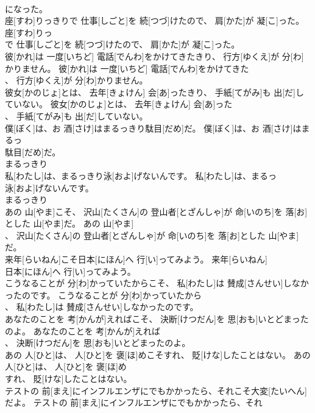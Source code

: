 \documentclass[8pt]{extreport}
\begin{document}
\begin{CJK}{UTF8}{min}
\\	になった。	
\\	座[すわ]りっきりで 仕事[しごと]を 続[つづ]けたので、 肩[かた]が 凝[こ]った。	座[すわ]りっ
\\	で 仕事[しごと]を 続[つづ]けたので、 肩[かた]が 凝[こ]った。	
\\	彼[かれ]は 一度[いちど] 電話[でんわ]をかけてきたきり、 行方[ゆくえ]が 分[わ]かりません。	彼[かれ]は 一度[いちど] 電話[でんわ]をかけてきた
\\	、 行方[ゆくえ]が 分[わ]かりません。	
\\	彼女[かのじょ]とは、 去年[きょけん] 会[あ]ったきり、 手紙[てがみ]も 出[だ]していない。	彼女[かのじょ]とは、 去年[きょけん] 会[あ]った
\\	、 手紙[てがみ]も 出[だ]していない。	
\\	僕[ぼく]は、お 酒[さけ]はまるっきり駄目[だめ]だ。	僕[ぼく]は、お 酒[さけ]はまるっ
\\	駄目[だめ]だ。	
\\	まるっきり
\\	私[わたし]は、まるっきり泳[およ]げないんです。	私[わたし]は、まるっ
\\	泳[およ]げないんです。	
\\	まるっきり
\\	あの 山[やま]こそ、 沢山[たくさん]の 登山者[とざんしゃ]が 命[いのち]を 落[お]とした 山[やま]だ。	あの 山[やま]
\\	、 沢山[たくさん]の 登山者[とざんしゃ]が 命[いのち]を 落[お]とした 山[やま]だ。	
\\	来年[らいねん]こそ日本[にほん]へ 行[い]ってみよう。	来年[らいねん]
\\	日本[にほん]へ 行[い]ってみよう。	
\\	こうなることが 分[わ]かっていたからこそ、 私[わたし]は 賛成[さんせい]しなかったのです。	こうなることが 分[わ]かっていたから
\\	、 私[わたし]は 賛成[さんせい]しなかったのです。	
\\	あなたのことを 考[かんが]えればこそ、 決断[けつだん]を 思[おも]いとどまったのよ。	あなたのことを 考[かんが]えれば
\\	、 決断[けつだん]を 思[おも]いとどまったのよ。	
\\	あの 人[ひと]は、 人[ひと]を 褒[ほ]めこそすれ、 貶[けな]したことはない。	あの 人[ひと]は、 人[ひと]を 褒[ほ]め
\\	すれ、 貶[けな]したことはない。	
\\	テストの 前[まえ]にインフルエンザにでもかかったら、それこそ大変[たいへん]だよ。	テストの 前[まえ]にインフルエンザにでもかかったら、それ

\end{CJK}
\end{document}
